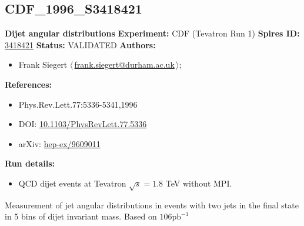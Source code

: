 \subsection[CDF\_1996\_S3418421]{CDF\_1996\_S3418421\,\cite{Abe:1996mj}}
\textbf{Dijet angular distributions}\newline
\textbf{Experiment:} CDF (Tevatron Run 1) \newline
\textbf{Spires ID:} \href{http://www.slac.stanford.edu/spires/find/hep/www?rawcmd=key+3418421}{3418421}\newline
\textbf{Status:} VALIDATED\newline
\textbf{Authors:}
\begin{itemize}
  \item Frank Siegert $\langle\,$\href{mailto:frank.siegert@durham.ac.uk}{frank.siegert@durham.ac.uk}$\,\rangle$;
\end{itemize}
\textbf{References:}
\begin{itemize}
  \item Phys.Rev.Lett.77:5336-5341,1996
  \item DOI: \href{http://dx.doi.org/10.1103/PhysRevLett.77.5336}{10.1103/PhysRevLett.77.5336}
  \item arXiv: \href{http://arxiv.org/abs/hep-ex/9609011}{hep-ex/9609011}
\end{itemize}
\textbf{Run details:}
\begin{itemize}

  \item QCD dijet events at Tevatron $\sqrt{s}=1.8$ TeV without MPI.\end{itemize}

\noindent Measurement of jet angular distributions in events with two jets in the final state in 5 bins of dijet invariant mass. Based on $106 \mathrm{pb}^{-1}$

\clearpage


\clearpage

